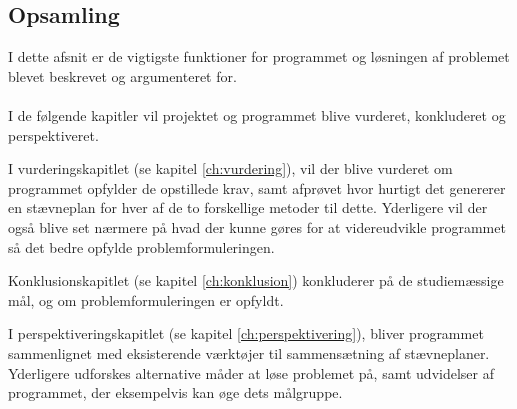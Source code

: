 \subsection*{Opsamling} 
I dette afsnit er de vigtigste funktioner for programmet og løsningen af problemet blevet beskrevet og argumenteret for. 
\\\\
I de følgende kapitler vil projektet og programmet blive vurderet, konkluderet og perspektiveret. 
\par
I vurderingskapitlet (se kapitel \ref{ch:vurdering}), vil der blive vurderet om programmet opfylder de opstillede krav, samt afprøvet hvor hurtigt det genererer en stævneplan for hver af de to forskellige metoder til dette. Yderligere vil der også blive set nærmere på hvad der kunne gøres for at videreudvikle programmet så det bedre opfylde problemformuleringen.
\par
Konklusionskapitlet (se kapitel \ref{ch:konklusion}) konkluderer på de studiemæssige mål, og om problemformuleringen er opfyldt.
\par
I perspektiveringskapitlet (se kapitel \ref{ch:perspektivering}), bliver programmet sammenlignet med eksisterende værktøjer til sammensætning af stævneplaner. Yderligere udforskes alternative måder at løse problemet på, samt udvidelser af programmet, der eksempelvis kan øge dets målgruppe. 






